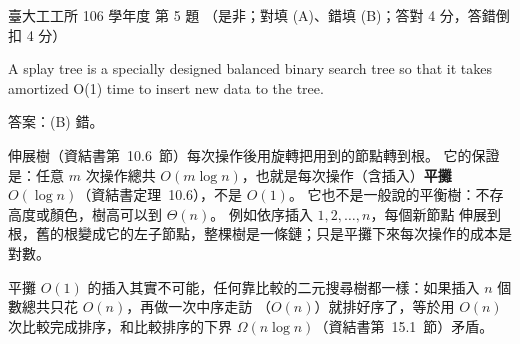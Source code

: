 \begin{pastexam}[label={px:ntu-106-ie-ds-05}]{臺大工工所 106 學年度 第 5 題}
（是非；對填 (A)、錯填 (B)；答對 4 分，答錯倒扣 4 分）

A splay tree is a specially designed balanced binary search tree so that it takes amortized O(1) time
to insert new data to the tree.
\end{pastexam}

\begin{pastsoln}
答案：(B) 錯。

伸展樹（資結書第~10.6~節）每次操作後用旋轉把用到的節點轉到根。 它的保證是：任意 $m$ 次操作總共
$O(m \log n)$，也就是每次操作（含插入）\textbf{平攤 $O(\log n)$}（資結書定理~10.6），不是 $O(1)$。
它也不是一般說的平衡樹：不存高度或顏色，樹高可以到 $\Theta(n)$。 例如依序插入 $1, 2, \ldots, n$，每個新節點
伸展到根，舊的根變成它的左子節點，整棵樹是一條鏈；只是平攤下來每次操作的成本是對數。

平攤 $O(1)$ 的插入其實不可能，任何靠比較的二元搜尋樹都一樣：如果插入 $n$ 個數總共只花 $O(n)$，再做一次中序走訪
（$O(n)$）就排好序了，等於用 $O(n)$ 次比較完成排序，和比較排序的下界 $\Omega(n \log n)$（資結書第~15.1~節）矛盾。
\end{pastsoln}

